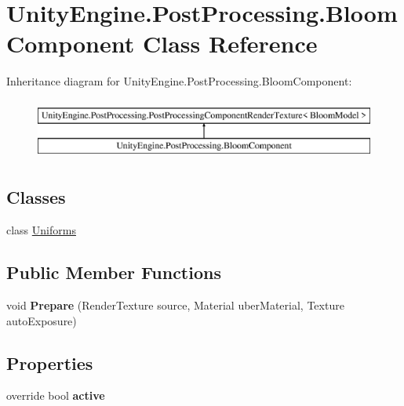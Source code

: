 \hypertarget{class_unity_engine_1_1_post_processing_1_1_bloom_component}{}\section{Unity\+Engine.\+Post\+Processing.\+Bloom\+Component Class Reference}
\label{class_unity_engine_1_1_post_processing_1_1_bloom_component}
Inheritance diagram for Unity\+Engine.\+Post\+Processing.\+Bloom\+Component\+:\begin{figure}[H]
\begin{center}
\leavevmode
\includegraphics[height=2.000000cm]{class_unity_engine_1_1_post_processing_1_1_bloom_component}
\end{center}
\end{figure}
\subsection*{Classes}
\begin{DoxyCompactItemize}
\item 
class \hyperlink{class_unity_engine_1_1_post_processing_1_1_bloom_component_1_1_uniforms}{Uniforms}
\end{DoxyCompactItemize}
\subsection*{Public Member Functions}
\begin{DoxyCompactItemize}
\item 
\mbox{\label{class_unity_engine_1_1_post_processing_1_1_bloom_component_a36a84fe1a81b038c9e1e0b9e8053c63f}} 
void {\bfseries Prepare} (Render\+Texture source, Material uber\+Material, Texture auto\+Exposure)
\end{DoxyCompactItemize}
\subsection*{Properties}
\begin{DoxyCompactItemize}
\item 
\mbox{\label{class_unity_engine_1_1_post_processing_1_1_bloom_component_a8ad2506285bcf581fc6b39f04650baa7}} 
override bool {\bfseries active}
\end{DoxyCompactItemize}
